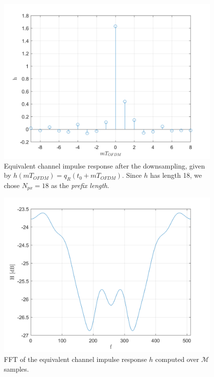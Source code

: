 \documentclass[a4paper, 12pt]{report}
\begin{document}
\begin{figure}[H]
	\centering
	\includegraphics[width=14cm]{h}
	\caption{Equivalent channel impulse response after the downsampling, given by $h(mT_{OFDM}) = q_R(t_0+mT_{OFDM})$. Since $h$ has length 18, we chose $N_{px}=18$ as the \textit{prefix length}.}
\end{figure}

\begin{figure}[H]
	\centering
	\includegraphics[width=14cm]{H_fft}
	\caption{FFT of the equivalent channel impulse response $h$ computed over $\mathcal{M}$ samples.}
\end{figure}
\end{document}
